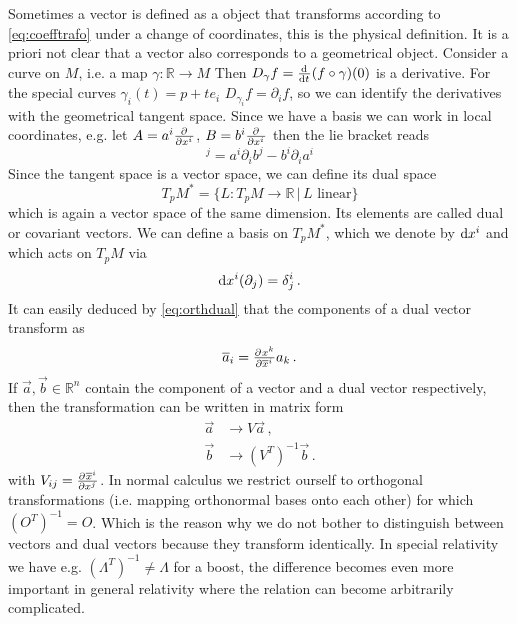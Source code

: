 Sometimes a vector is defined as a object that transforms according to \ref{eq:coefftrafo} under a change of coordinates, 
this is the physical definition. It is a priori not clear that a vector also corresponds to a geometrical object. 
Consider a curve on $M$, i.e. a map $\gamma:\mathbb{R}\to M$
Then $D_\gamma f=\od{}{t}(f\circ\gamma)(0)$ is a derivative.
For the special curves $\gamma_i(t)=p+te_i$
$D_{\gamma_i} f=\partial_if$, so we can identify the derivatives with the geometrical tangent space.
Since we have a basis we can work in local coordinates, e.g. let $A=a^i\pd{}{{x^i}}$, $B=b^i\pd{}{{x^i}}$ then the lie bracket reads
\begin{equation}
    [A,B]^j=a^i\partial_ib^j-b^i\partial_ia^i
\end{equation}
Since the tangent space is a vector space, we can define its dual space
\begin{equation}
    T_pM^*=\{L:T_pM\to \mathbb{R}\, |\, L \text{ linear}\}
\end{equation}
which is again a vector space of the same dimension. Its elements are called dual or covariant vectors.
We can define a basis on $	T_pM^*$, which we denote by $\dif x^i$ and  which acts on $T_pM$ via
\begin{equation}
    \dif x^i(\partial_j)=\delta^i_j\, . \label{eq:orthdual}
\end{equation}
It can easily deduced by \eqref{eq:orthdual} that the components of a dual vector transform as
\begin{equation}
    \overline{a}_i=\pd{x^k}{{\overline{x}^i}}a_k\, .
\end{equation}
If $\vec{a},\vec{b}\in\mathbb{R}^n$ contain the component of a vector and a dual vector respectively, 
then the transformation can be written in matrix form
\begin{align*}
    \vec{a}&\to V\vec{a}\, ,\\
    \vec{b}&\to\left(V^T\right)^{-1}\vec{b}\, .
\end{align*}
with $V_{ij}=\pd{\overline{x}^i}{{x^j}}$. 
In normal calculus we restrict ourself to orthogonal transformations (i.e. mapping orthonormal bases onto each other) for which $(O^T)^{-1}=O$. 
Which is the reason why we do not bother to distinguish between vectors and dual vectors because they transform identically. 
In special relativity we have e.g. $(\Lambda^T)^{-1}\neq\Lambda$ for a boost, the difference becomes even more important in general 
relativity where the relation can become arbitrarily complicated.
